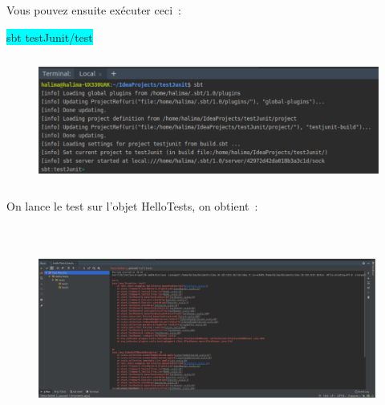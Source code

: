 \documentclass[12pt]{article}
\begin{document}

\par

Vous pouvez ensuite exécuter ceci :\par

\colorbox{Cyan}{sbt testJunit/test}\par




\begin{figure}[H]
	\begin{Center}
		\includegraphics[width=5.26in,height=1.65in]{./media/image5.png}
	\end{Center}
\end{figure}



\par

On lance le test sur l’objet HelloTests, on obtient :\par




\begin{figure}[H]
	\begin{Center}
		\includegraphics[width=6.12in,height=2.68in]{./media/image6.png}
	\end{Center}
\end{figure}
\end{document}

